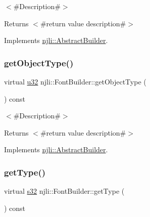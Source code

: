$<$\#\+Description\#$>$

\begin{DoxyReturn}{Returns}
$<$\#return value description\#$>$ 
\end{DoxyReturn}


Implements \mbox{\hyperlink{classnjli_1_1_abstract_builder_a902f73ea78031b06aca183a417f3413b}{njli\+::\+Abstract\+Builder}}.

\mbox{\label{classnjli_1_1_font_builder_aa1d6db09f6ba63fc47485154c62396aa}} 
\subsubsection{\texorpdfstring{get\+Object\+Type()}{getObjectType()}}
{\footnotesize\ttfamily virtual \mbox{\hyperlink{_util_8h_a10e94b422ef0c20dcdec20d31a1f5049}{u32}} njli\+::\+Font\+Builder\+::get\+Object\+Type (\begin{DoxyParamCaption}{ }\end{DoxyParamCaption}) const\hspace{0.3cm}{\ttfamily [virtual]}}

$<$\#\+Description\#$>$

\begin{DoxyReturn}{Returns}
$<$\#return value description\#$>$ 
\end{DoxyReturn}


Implements \mbox{\hyperlink{classnjli_1_1_abstract_builder_a0f2d344fcf697b167f4f2b1122b5fb33}{njli\+::\+Abstract\+Builder}}.

\mbox{\label{classnjli_1_1_font_builder_ab2d3a2baf477566f80b44a5f593fcfad}} 
\subsubsection{\texorpdfstring{get\+Type()}{getType()}}
{\footnotesize\ttfamily virtual \mbox{\hyperlink{_util_8h_aa62c75d314a0d1f37f79c4b73b2292e2}{s32}} njli\+::\+Font\+Builder\+::get\+Type (\begin{DoxyParamCaption}{ }\end{DoxyParamCaption}) const\hspace{0.3cm}{\ttfamily [virtual]}}

